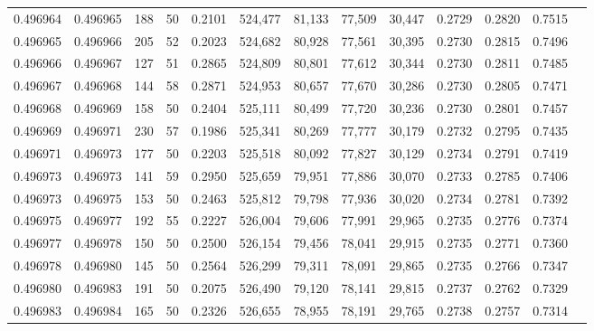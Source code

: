 \begin{tabular}{rrrrrrrrrrrrr}
0.496964 & 0.496965 &   188 &  50 &                                     0.2101 & 524,477 &  81,133 &  77,509 &  30,447 & 0.2729 & 0.2820 & 0.7515 \\
0.496965 & 0.496966 &   205 &  52 &                                     0.2023 & 524,682 &  80,928 &  77,561 &  30,395 & 0.2730 & 0.2815 & 0.7496 \\
0.496966 & 0.496967 &   127 &  51 &                                     0.2865 & 524,809 &  80,801 &  77,612 &  30,344 & 0.2730 & 0.2811 & 0.7485 \\
0.496967 & 0.496968 &   144 &  58 &                                     0.2871 & 524,953 &  80,657 &  77,670 &  30,286 & 0.2730 & 0.2805 & 0.7471 \\
0.496968 & 0.496969 &   158 &  50 &                                     0.2404 & 525,111 &  80,499 &  77,720 &  30,236 & 0.2730 & 0.2801 & 0.7457 \\
0.496969 & 0.496971 &   230 &  57 &                                     0.1986 & 525,341 &  80,269 &  77,777 &  30,179 & 0.2732 & 0.2795 & 0.7435 \\
0.496971 & 0.496973 &   177 &  50 &                                     0.2203 & 525,518 &  80,092 &  77,827 &  30,129 & 0.2734 & 0.2791 & 0.7419 \\
0.496973 & 0.496973 &   141 &  59 &                                     0.2950 & 525,659 &  79,951 &  77,886 &  30,070 & 0.2733 & 0.2785 & 0.7406 \\
0.496973 & 0.496975 &   153 &  50 &                                     0.2463 & 525,812 &  79,798 &  77,936 &  30,020 & 0.2734 & 0.2781 & 0.7392 \\
0.496975 & 0.496977 &   192 &  55 &                                     0.2227 & 526,004 &  79,606 &  77,991 &  29,965 & 0.2735 & 0.2776 & 0.7374 \\
0.496977 & 0.496978 &   150 &  50 &                                     0.2500 & 526,154 &  79,456 &  78,041 &  29,915 & 0.2735 & 0.2771 & 0.7360 \\
0.496978 & 0.496980 &   145 &  50 &                                     0.2564 & 526,299 &  79,311 &  78,091 &  29,865 & 0.2735 & 0.2766 & 0.7347 \\
0.496980 & 0.496983 &   191 &  50 &                                     0.2075 & 526,490 &  79,120 &  78,141 &  29,815 & 0.2737 & 0.2762 & 0.7329 \\
0.496983 & 0.496984 &   165 &  50 &                                     0.2326 & 526,655 &  78,955 &  78,191 &  29,765 & 0.2738 & 0.2757 & 0.7314 \\

\end{tabular}
